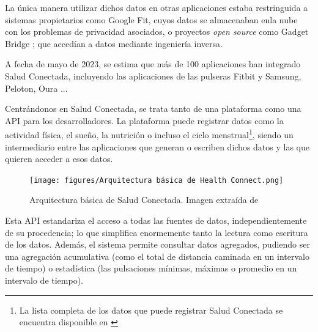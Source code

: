             La única manera utilizar dichos datos 
            en otras aplicaciones estaba restringuida a sistemas propietarios como Google Fit, cuyos datos se 
            almacenaban enla nube con los problemas de privacidad asociados, o proyectos \textit{open source} como 
            Gadget Bridge \cite{freeyourgadget_gadgetbridge_nodate}; que accedían a datos mediante ingeniería inversa.
            

            A fecha de mayo de 2023, se estima que más de 100 aplicaciones han integrado Salud Conectada, incluyendo
            las aplicaciones de las pulseras Fitbit y Samsung, Peloton, Oura \cite{malik_googles_2023}... 

            Centrándonos en Salud Conectada, se trata tanto de una plataforma como una API para los desarrolladores.
            La plataforma puede registrar datos como la actividad física, el sueño, la nutrición o incluso el ciclo
            menstrual\footnote{La lista completa de los datos que puede registrar Salud Conectada se encuentra 
            disponible en \cite{noauthor_lista_nodate}}, siendo un intermediario entre las aplicaciones que generan 
            o escriben dichos datos y las que quieren acceder a esos datos. 

            \begin{figure}[h]
                \centering
                \texttt{[image: figures/Arquitectura básica de Health Connect.png]}
                \caption[Arquitectura básica de Salud Conectada.]
                {Arquitectura básica de  Salud Conectada. Imagen extraída de \cite{wilk_introducing_2022}}
                \label{figure:health_connect:arquitectura}
            \end{figure}

            Esta API estandariza el acceso a todas las fuentes de datos, independientemente de su procedencia; lo que
            simplifica enormemente tanto la lectura como escritura de los datos. Además, el sistema permite consultar
            datos agregados, pudiendo ser una agregación acumulativa (como el total de distancia caminada en un 
            intervalo de tiempo) o estadística (las pulsaciones mínimas, máximas o promedio en un intervalo de tiempo).

